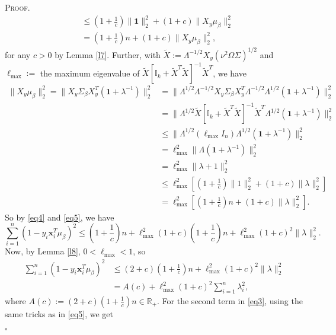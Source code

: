 \documentclass[12pt]{article}
\newcounter{ProofCounter}
\newenvironment{Proof}{\stepcounter{ProofCounter}\textsc{Proof.}}{\hfill$\square$}
\numberwithin{equation}{section}
\begin{document}
\begin{Proof}
\begin{align}
    & \leq \left(1 + \frac{1}{c}\right) \|\mathbf{1}\|_{2}^{2} + \left( 1 + c \right)\|X_{y}\mu_{\beta}\|_{2}^{2} \nonumber \\
    & = \left( 1 + \frac{1}{c} \right) n + (1 + c)\|X_y \mu_\beta \|_2^2,
    \label{eq4}
  \end{align}
  for any $c > 0$ by Lemma \ref{l7}. Further, with $\tilde{X} := \Lambda^{-1/2}X_{y}(\nu^{2}\Omega\Sigma)^{1/2}$ and 
  $\ell_{\max} :=$ the maximum eigenvalue of $\tilde{X}[\mathbb{I}_k + \tilde{X}^T \tilde{X}]^{-1} \tilde{X}^T$, we have
  \begin{align}
    \| X_{y} \mu_{\beta}\|_{2}^{2} = \|X_{y}\Sigma_{\beta} X_{y}^T (\bm{1} + \lambda^{-1})\|_{2}^{2} 
    & = \| \Lambda^{1/2}\Lambda^{-1/2} X_{y}\Sigma_{\beta}X_{y}^T \Lambda^{-1/2} \Lambda^{1/2} (\bm{1} + \lambda^{-1})\|_{2}^{2} \nonumber \\
    & = \| \Lambda^{1/2} \tilde{X}[ \mathbb{I}_{k} + \tilde{X}^T \tilde{X} ]^{-1} \tilde{X}^T \Lambda^{1/2} (\mathbf{1} + \lambda^{-1})\|_{2}^{2} \nonumber \\
    & \leq \| \Lambda^{1/2} (\ell_{\max}I_{n}) \Lambda^{1/2}  (\mathbf{1} + \lambda^{-1})\|_{2}^{2} \nonumber \\
    & = \ell_{\max}^2 \| \Lambda (\mathbf{1} + \lambda^{-1})\|_{2}^{2} \nonumber \\
    & = \ell_{\max}^2 \| \lambda + 1\|_{2}^{2} \nonumber \\
    & \leq \ell_{\max}^2 \left[ \left( 1 + \frac{1}{c} \right) \|1\|_{2}^{2} + (1 + c) \|\lambda \|_{2}^{2}\right] \nonumber \\
    & = \ell_{\max}^2 \left[ \left( 1 + \frac{1}{c} \right) n + (1 + c) \|\lambda \|_{2}^{2}\right].
    \label{eq5}
  \end{align}
  So by \eqref{eq4} and \eqref{eq5}, we have 
  \[
    \sum_{i=1}^{n} ( 1 - y_i \bm{x}_i^T \mu_\beta )^2 \leq \left( 1 + \frac{1}{c} \right)n + \ell_{\max}^2(1 + c)\left( 1 + \frac{1}{c}\right) n 
    + \ell_{\max}^2 (1 + c)^2 \|\lambda\|_2^2.
  \]
  Now, by Lemma \ref{l8}, $0 < \ell_{\max} < 1$, so
  \begin{align}
    \sum_{i=1}^{n} ( 1 - y_i \bm{x}_i^T \mu_\beta )^2 & \leq (2 + c)\left( 1 + \frac{1}{c} \right)n + \ell_{\max}^2 (1 + c)^2 \|\lambda\|_2^2
    \nonumber \\
    & = A(c) + \ell_{\max}^2(1 + c)^2 \sum_{i=1}^{n} \lambda_i^2,
    \label{eq6}
  \end{align}
  where $A(c) := (2 + c)\left( 1 + \frac{1}{c} \right) n \in \mathbb{R}_{+}$.
  For the second term in \eqref{eq3}, using the same tricks as in \eqref{eq5}, we get

\end{Proof}
\end{document}

